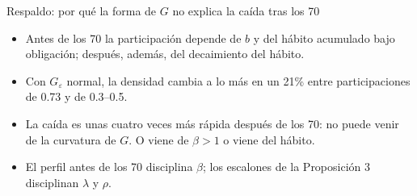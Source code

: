 \documentclass[aspectratio=169,11pt,xcolor=table]{beamer}
\newcommand{\1}{\mathbbm{1}}
\begin{document}
\begin{frame}{Respaldo: por qué la forma de $G$ no explica la caída tras los 70}
  \begin{itemize}\setlength{\itemsep}{0.7em}
    \item Antes de los 70 la participación depende de $b$ y del hábito acumulado bajo obligación; después, además, del decaimiento del hábito.
    \item Con $G_\varepsilon$ normal, la densidad cambia a lo más en un 21\% entre participaciones de 0.73 y de 0.3--0.5.
    \item La caída es unas cuatro veces más rápida después de los 70: no puede venir de la curvatura de $G$. O viene de $\beta>1$ o viene del hábito.
    \item El perfil antes de los 70 disciplina $\beta$; los escalones de la Proposición 3 disciplinan $\lambda$ y $\rho$.
  \end{itemize}
\end{frame}
\end{document}

